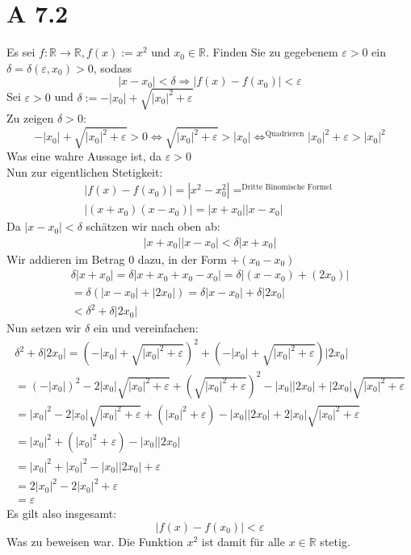 \documentclass{article}
\begin{document}
    \section*{A 7.2}
    Es sei \(f: \mathbb{R} \to \mathbb{R}, f(x) := x^2\) und \(x_0 \in \mathbb{R}\).
    Finden Sie zu gegebenem \(\varepsilon > 0\) ein \(\delta = \delta(\varepsilon, x_0) > 0\), sodass
    \[ |x-x_0| < \delta \Rightarrow |f(x) - f(x_0)| < \varepsilon \]
    Sei \(\varepsilon > 0\) und \(\delta := -|x_0| + \sqrt{ {|x_0|}^2 + \varepsilon } \) \\
    Zu zeigen \(\delta > 0\): \\
    \[ -|x_0| + \sqrt{ {|x_0|}^2 + \varepsilon} > 0 \Leftrightarrow \sqrt{ {|x_0|}^2 + \varepsilon} > |x_0| \Leftrightarrow^{\text{Quadrieren}}  {|x_0|}^2 + \varepsilon > {|x_0|}^2 \]
    Was eine wahre Aussage ist, da \(\varepsilon > 0\) \\
    Nun zur eigentlichen Stetigkeit:
    \begin{gather*}
        |f(x) - f(x_0)| = |x^2 - x_0^2| =^{\text{Dritte Binomische Formel}} \\
        |( x + x_0 ) ( x - x_0 )| = |x + x_0| |x - x_0|
    \end{gather*}
    Da \( |x-x_0| < \delta \) schätzen wir nach oben ab:
    \begin{gather*}
        |x + x_0| |x - x_0| < \delta | x + x_0 |
    \end{gather*}
    Wir addieren im Betrag 0 dazu, in der Form \( +(x_0 - x_0) \)
    \begin{gather*}
        \delta | x + x_0 | = \delta | x + x_0 + x_0 - x_0| = \delta | (x - x_0) + (2 x_0)| \\
        = \delta (|x - x_0| + |2 x_0|) = \delta |x - x_0| + \delta |2 x_0| \\
        < \delta^2 + \delta |2x_0|
    \end{gather*}
    Nun setzen wir \( \delta \) ein und vereinfachen:
    \begin{gather*}
        \delta^2 + \delta |2x_0| = {\left( -|x_0| + \sqrt{ {|x_0|}^2 + \varepsilon } \right)}^2 + \left( -|x_0| + \sqrt{ {|x_0|}^2 + \varepsilon } \right) |2x_0| \\
        = {(-|x_0|)}^2 -2|x_0|\sqrt{ {|x_0|}^2 + \varepsilon } + {\left( \sqrt{ {|x_0|}^2 + \varepsilon } \right)}^2 -|x_0||2x_0| + |2x_0|\sqrt{ {|x_0|}^2 + \varepsilon } \\
        = {|x_0|}^2 -2|x_0|\sqrt{ {|x_0|}^2 + \varepsilon } + ({|x_0|}^2 + \varepsilon) -|x_0||2x_0| + 2|x_0|\sqrt{ {|x_0|}^2 + \varepsilon } \\
        = {|x_0|}^2 + ({|x_0|}^2 + \varepsilon) -|x_0||2x_0| \\
        = {|x_0|}^2 + {|x_0|}^2 -|x_0||2x_0| + \varepsilon \\
        = 2 {|x_0|}^2 - 2 {|x_0|}^2 + \varepsilon \\
        = \varepsilon
    \end{gather*}
    Es gilt also insgesamt:
    \[ |f(x) - f(x_0)| < \varepsilon \]
    Was zu beweisen war. Die Funktion \(x^2\) ist damit für alle \(x \in \mathbb{R}\) stetig.
\end{document}
